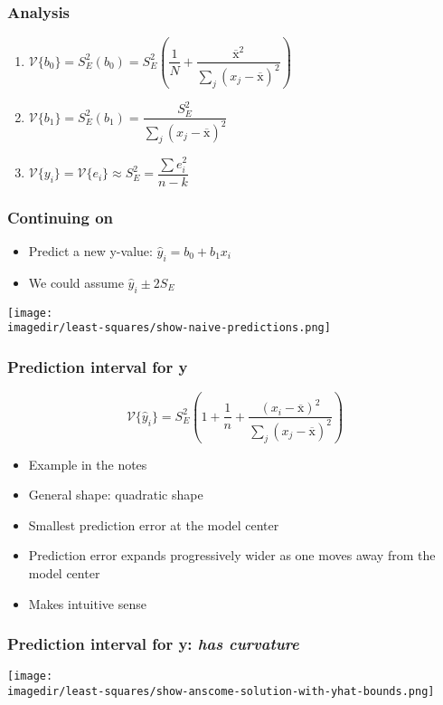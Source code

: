 \begin{frame}\frametitle{Analysis}
	\begin{enumerate}
		\item	$\mathcal{V}\{b_0\} = S_E^2(b_0) = S_E^2 \left(\dfrac{1}{N} + \dfrac{\overline{\mathrm{x}}^2}{\sum_j{\left( x_j - \overline{\mathrm{x}} \right)^2}} \right)$
		\item	$\mathcal{V}\{b_1\} = S_E^2(b_1) = \dfrac{S_E^2}{\sum_j{\left( x_j - \overline{\mathrm{x}} \right)^2}}$
		\item	$\mathcal{V}\{y_i\} = \mathcal{V}\{e_i\} \approx S_E^2 = \dfrac{\sum{e_i^2}}{n-k}$
	\end{enumerate}
\end{frame}

\begin{frame}\frametitle{Continuing on}
	\begin{itemize}
		\item	Predict a new y-value: $\hat{y}_i = b_0 + b_1 x_i$
		\item	We could assume $\hat{y}_i \pm 2S_E$
	\end{itemize}
	\begin{center}
		\texttt{[image: \\imagedir/least-squares/show-naive-predictions.png]}
	\end{center}
\end{frame}

\begin{frame}\frametitle{Prediction interval for y}

	$$\mathcal{V}\{\hat{y}_i\} = S_E^2 \left(1 + \dfrac{1}{n} + \dfrac{(x_i - \overline{\mathrm{x}})^2}{\sum_j{\left( x_j - \overline{\mathrm{x}} \right)^2}}\right)$$
	\begin{itemize}
		\item	Example in the notes
		\item	General shape: quadratic shape
		\item	Smallest prediction error at the model center
		\item	Prediction error expands progressively wider as one moves away from the model center
		\item	Makes intuitive sense
	\end{itemize}
\end{frame}

\begin{frame}\frametitle{Prediction interval for y: \emph{has curvature}}
	\begin{center}
		\texttt{[image: \\imagedir/least-squares/show-anscome-solution-with-yhat-bounds.png]}
	\end{center}
\end{frame}

